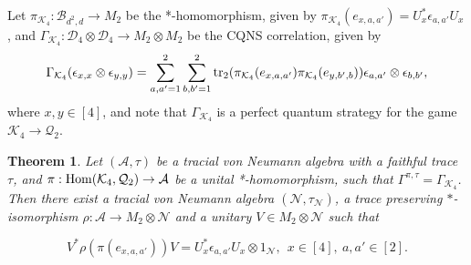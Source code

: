 \documentclass[11pt]{amsart}
\newtheorem{theorem}{Theorem}[section]
\theoremstyle{definition}
\newcommand{\cl}[1]{\mathcal{#1}}
\begin{document}
Let 
$\pi_{\cl K_4} : \cl B_{d^2,d} \to M_2$ be the 
*-homomorphism, given by 
$\pi_{\cl K_4}(e_{x,a,a'}) = U_x^*\epsilon_{a,a'}U_x$, and 
$\Gamma_{\cl K_4} : \cl D_4\otimes \cl D_4\to M_2\otimes M_2$ 
be the CQNS correlation, given by  
$$\Gamma_{\cl K_4}(\epsilon_{x,x}\otimes\epsilon_{y,y})
= \sum_{a,a'=1}^2 \sum_{b,b'=1}^2 {\rm tr_2}
(\pi_{\cl K_4}(e_{x,a,a'})\pi_{\cl K_4}(e_{y,b',b}))\epsilon_{a,a'}\otimes\epsilon_{b,b'},$$
where $x,y\in [4]$, 
and note that $\Gamma_{\cl K_4}$ is a perfect quantum strategy 
for the game $\cl K_{4}\rightarrow \cl Q_2$.


\begin{theorem}\label{repr}
Let $(\cl A,\tau)$ be a tracial von Neumann algebra with a faithful trace $\tau$, 
and $\pi :  {\rm Hom}(\cl K_{4}, \cl Q_2)\to \cl A$ be 
a unital *-homomorphism, such that 
$\Gamma^{\pi,\tau} = \Gamma_{\cl K_4}$. 
Then there exist a tracial von Neumann algebra $(\cl N,\tau_{\cl N})$, a trace preserving $*$-isomorphism $\rho: \cl A\to M_2\otimes\cl N$ and a unitary $V\in M_2\otimes \cl N$ such that 

\begin{equation}\label{eq_multimp}
V^*\rho(\pi(e_{x,a,a'}))V = U_x^*\epsilon_{a,a'}U_x\otimes 1_{\cl N}, 
\ \ x\in [4], \ a,a'\in [2]. 
\end{equation}
\end{theorem}
\end{document}
